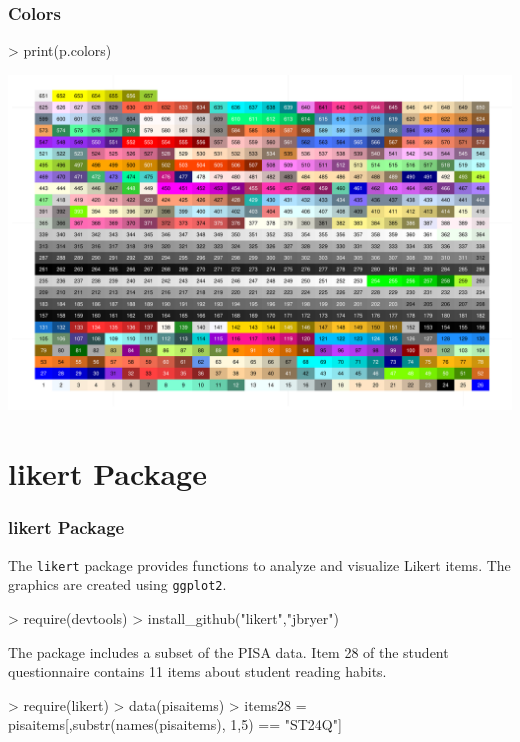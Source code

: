 \documentclass[10pt,slidestop,mathserif,c]{beamer}
\begin{document}
\begin{frame}
	\frametitle{Colors}
\begin{Schunk}
\begin{Sinput}
> print(p.colors)
\end{Sinput}
\end{Schunk}
\includegraphics{Slides-colors}
\end{frame}





\section{likert Package}

\begin{frame}
	\frametitle{likert Package}
	The \texttt{likert} package provides functions to analyze and visualize Likert items. The graphics are created using \texttt{ggplot2}.
	
\begin{Schunk}
\begin{Sinput}
> require(devtools)
> install_github("likert","jbryer")
\end{Sinput}
\end{Schunk}

    The package includes a subset of the PISA data. Item 28 of the student questionnaire contains 11 items about student reading habits.
    
\begin{Schunk}
\begin{Sinput}
> require(likert)
> data(pisaitems)
> items28 = pisaitems[,substr(names(pisaitems), 1,5) == "ST24Q"]
\end{Sinput}
\end{Schunk}

\end{frame}
\end{document}
